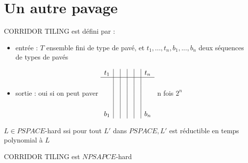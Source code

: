 \documentclass[10pt,a4paper]{article}
\begin{document}
\section{Un autre pavage}
CORRIDOR TILING est défini par :
\begin{itemize}
\item entrée : $T$ ensemble fini de type de pavé, et $t_1, ..., t_n, b_1, ..., b_n$ deux séquences de types de pavés
\item sortie : oui si on peut paver 
$\begin{array}{c| c| c | c | c | c}
t_1 & & & & & t_n\\
 \hline
& & & & & \\
& & & & & \\
& & & & & \\
& & & & & \\
b_1 & & & & & b_n
\end{array}$ n fois $2^n$
\end{itemize}

\begin{definition}{}$L \in PSPACE$-hard ssi pour tout $L'$ dans $PSPACE, L'$ est réductible en temps polynomial à $L$
\end{definition}
\begin{thm}
 CORRIDOR TILING est $NPSAPCE$-hard
\end{thm}
\end{document}
